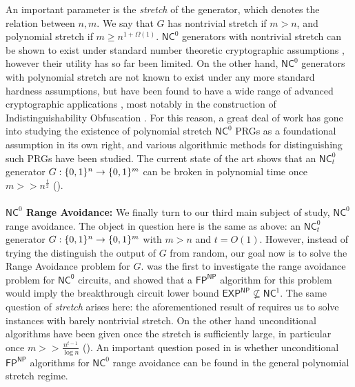 An important parameter is the \emph{stretch} of the generator, which denotes the relation between $n,m$. We say that $G$ has nontrivial stretch if $m >n$, and polynomial stretch if $m \geq n^{1+\Omega(1)}$. $\mathsf{NC}^0$ generators with nontrivial stretch can be shown to exist under standard number theoretic cryptographic assumptions \cite{randomized-encodings}, however their utility has so far been limited. On the other hand, $\mathsf{NC}^0$ generators with polynomial stretch are not known to exist under any more standard hardness assumptions, but have been found to have a wide range of advanced cryptographic applications \cite{ishai2008cryptography}, most notably in the construction of Indistinguishability Obfuscation \cite{jls1,jls2}. For this reason, a great deal of work has gone into studying the existence of polynomial stretch $\mathsf{NC}^0$ PRGs as a foundational assumption in its own right, and various algorithmic methods for distinguishing such PRGs have been studied. The current state of the art shows that an $\mathsf{NC}_t^0$ generator $G: \{0,1\}^n \to \{0,1\}^m$ can be broken in polynomial time once $m >> n^{\frac{t}{2}}$ (\cite{mossel-epsilon,aow,semirandom}).
~\\~\\
{\bf \noindent $\mathsf{NC}^0$ Range Avoidance:}
We finally turn to our third main subject of study, $\mathsf{NC}^0$ range avoidance. The object in question here is the same as above: an $\mathsf{NC}^0_t$ generator $G: \{0,1\}^n \to \{0,1\}^m$ with $m >n$ and $t = O(1)$. However, instead of trying the distinguish the output of $G$ from random, our goal now is to solve the Range Avoidance problem for $G$.
 \cite{RSW} was the first to investigate the range avoidance problem for $\mathsf{NC^0}$ circuits, and showed that a $\mathsf{FP^{NP}}$ algorithm for this problem would imply the breakthrough circuit lower bound $\mathsf{EXP^{NP}} \not\subseteq \mathsf{NC}^1$. The same question of \emph{stretch} arises here: the aforementioned result of \cite{RSW} requires us to solve instances with barely nontrivial stretch. On the other hand unconditional algorithms have been given once the stretch is sufficiently large, in particular once $m >> \frac{n^{t-1}}{\log n}$ (\cite{guruswami2022range,karthik}). An important question posed in \cite{RSW} is whether unconditional $\mathsf{FP^{NP}}$ algorithms for $\mathsf{NC}^0$ range avoidance can be found in the general polynomial stretch regime.
